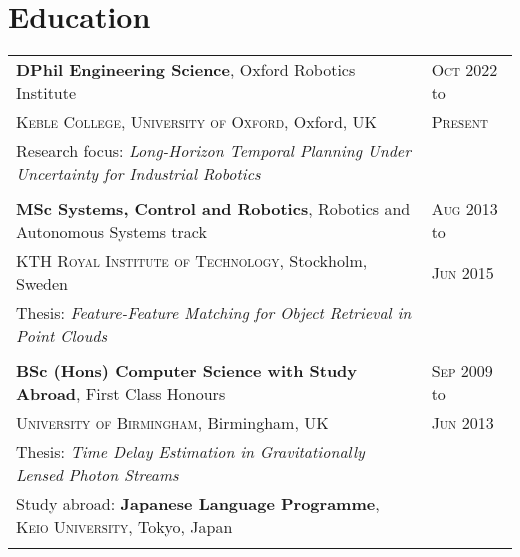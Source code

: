 \documentclass[a4paper,10pt]{article}
\newcommand{\datelen}{1.8cm}
\newcommand{\descrlen}{15.5cm}
\begin{document}
\section{Education} 
\begin{tabular}{p{\descrlen}|p{\datelen}}
  \textbf{DPhil Engineering Science}, Oxford Robotics Institute&  \textsc{Oct 2022} to\\
   \textsc{Keble College, University of Oxford}, Oxford, UK & \textsc{Present}\\
  Research focus: \emph{Long-Horizon Temporal Planning Under Uncertainty for Industrial
  Robotics}&\\\multicolumn{2}{c}{}\\[-0.2cm]
  
  \textbf{MSc Systems, Control and Robotics}, Robotics and Autonomous Systems track & \textsc{Aug 2013} to\\
  \textsc{KTH Royal Institute of Technology}, Stockholm, Sweden & \textsc{Jun 2015}\\
  Thesis: \emph{Feature-Feature Matching for Object Retrieval in Point Clouds}&\\\multicolumn{2}{c}{}\\[-0.2cm]
  \textbf{BSc (Hons) Computer Science with Study Abroad}, First Class Honours & \textsc{Sep 2009} to\\
  \textsc{University of Birmingham}, Birmingham, UK&\textsc{Jun 2013}\\
                                                               Thesis: \emph{Time Delay Estimation in Gravitationally Lensed Photon Streams}&\\
                      Study abroad: \textbf{Japanese Language Programme}, \textsc{Keio University}, Tokyo, Japan&\\
  \multicolumn{2}{c}{}\\[-0.2cm]
\end{tabular}
\end{document}
